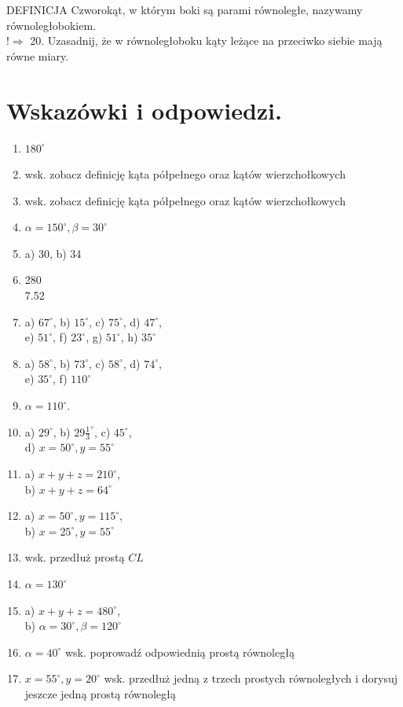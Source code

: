 \documentclass[10pt]{article}
\begin{document}
DEFINICJA Czworokąt, w którym boki są parami równoległe, nazywamy równoległobokiem.\\
\(!\Rightarrow\) 20. Uzasadnij, że w równoległoboku kąty leżące na przeciwko siebie mają równe miary.

\section*{Wskazówki i odpowiedzi.}
\begin{enumerate}
  \item \(180^{\circ}\)
  \item wsk. zobacz definicję kąta półpełnego oraz kątów wierzchołkowych
  \item wsk. zobacz definicję kąta półpełnego oraz kątów wierzchołkowych
  \item \(\alpha=150^{\circ}, \beta=30^{\circ}\)
  \item a) 30, b) 34
  \item 280\\
7.52
  \item a) \(67^{\circ}\), b) \(15^{\circ}\), c) \(75^{\circ}\), d) \(47^{\circ}\),\\
e) \(51^{\circ}\), f) \(23^{\circ}\), g) \(51^{\circ}\), h) \(35^{\circ}\)
  \item a) \(58^{\circ}\), b) \(73^{\circ}\), c) \(58^{\circ}\), d) \(74^{\circ}\),\\
e) \(35^{\circ}\), f) \(110^{\circ}\)
  \item \(\alpha=110^{\circ}\).
  \item a) \(29^{\circ}\), b) \(29 \frac{1}{3}^{\circ}\), c) \(45^{\circ}\),\\
d) \(x=50^{\circ}, y=55^{\circ}\)
  \item a) \(x+y+z=210^{\circ}\),\\
b) \(x+y+z=64^{\circ}\)
  \item a) \(x=50^{\circ}, y=115^{\circ}\),\\
b) \(x=25^{\circ}, y=55^{\circ}\)
  \item wsk. przedłuż prostą \(C L\)
  \item \(\alpha=130^{\circ}\)
  \item a) \(x+y+z=480^{\circ}\),\\
b) \(\alpha=30^{\circ}, \beta=120^{\circ}\)
  \item \(\alpha=40^{\circ}\) wsk. poprowadź odpowiednią prostą równoległą
  \item \(x=55^{\circ}, y=20^{\circ}\) wsk. przedłuż jedną z trzech prostych równoległych i dorysuj jeszcze jedną prostą równoległą
\end{enumerate}
\end{document}
